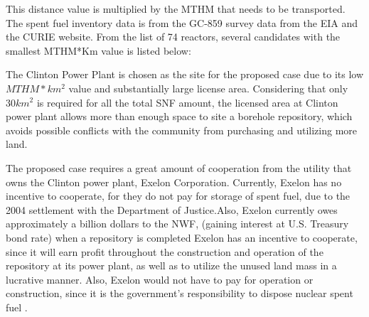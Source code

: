  
 This distance value is multiplied by the \gls{MTHM} that needs to be transported.
     The spent fuel inventory data
    is from the GC-859 survey data from the \gls{EIA} %
    and the \gls{CURIE} website. 
     From the list of 74 reactors, several candidates
    with the smallest MTHM*Km value is listed below:
    
    
\begin{table}[h]
\centering

    \caption { Reactors with relatively small MTHM*Km value}
\end {table}


The Clinton Power Plant is chosen as the site for the proposed case due to its
low $MTHM*km^2$ value and substantially large license area.\cite{NRC_Clinton}
 Considering that only
 $30km^2$ is required for all the total \gls{SNF} amount, the licensed area at Clinton
  power plant allows more than  enough space to site a borehole repository, which
   avoids possible conflicts with the community from purchasing and utilizing more
    land. 
  
  The proposed case requires a great amount of cooperation from the utility that owns
  the Clinton power plant, Exelon Corporation. Currently, Exelon has no 
  incentive to cooperate, for they do not pay for storage of spent fuel, due to 
  the 2004 settlement with the Department of Justice.Also, Exelon currently owes
  approximately a billion dollars to the \gls{NWF},
  (gaining interest at U.S. Treasury bond rate) when a repository is completed
  \cite{Ewing_2009}
  Exelon has an incentive to cooperate,
  since it will earn profit throughout the construction and operation of the 
  repository at its power plant, as well as to utilize the unused land mass
  in a lucrative manner. Also, Exelon would not have to pay for operation or 
  construction, since it is the government's responsibility to dispose nuclear
  spent fuel \cite{Ewing_2009}. 
  
